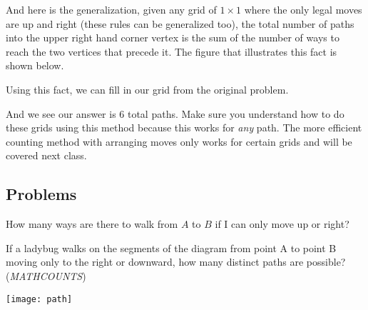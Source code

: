 And here is the generalization, given any grid of $1\times 1$ where the only legal moves are up and right (these rules can be generalized too), the total number of paths into the upper right hand corner vertex is the sum of the number of ways to reach the two vertices that precede it. The figure that illustrates this fact is shown below.
\begin{center}
\end{center}
Using this fact, we can fill in our grid from the original problem.
\begin{center}
\end{center}

And we see our answer is 6 total paths. Make sure you understand how to do these grids using this method because this works for \textit{any} path. The more efficient counting method with arranging moves only works for certain grids and will be covered next class.

\subsection{Problems}

\begin{problem}
How many ways are there to walk from $A$ to $B$ if I can only move up or right?
\begin{center}
\end{center}
\end{problem}

\begin{problem}
If a ladybug walks on the segments of the diagram from point A to point B moving only to the right or downward, how many distinct paths are possible?  (\textit{MATHCOUNTS})
\begin{center}
\texttt{[image: path]}
\end{center}
\end{problem}


